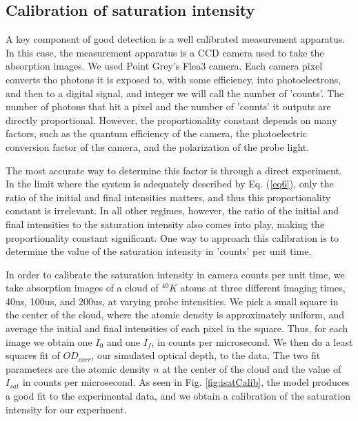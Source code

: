 \documentclass[12pt]{iopart}
\begin{document}
\subsection{Calibration of saturation intensity}
A key component of good detection is a well calibrated measurement apparatus. In this case, the measurement apparatus is a CCD camera used to take the absorption images. We used Point Grey's Flea3 camera.  Each camera pixel  converts tho photons it is exposed to, with some efficiency, into photoelectrons, and then to a digital signal, and integer we will call the number of 'counts'. The number of photons that hit a pixel and the number of 'counts' it outputs are directly proportional. However, the proportionality constant depends on many factors, such as the quantum efficiency of the camera, the photoelectric conversion factor of the camera, and the polarization of the probe light. 
\par The most accurate way to determine this factor is through a direct experiment. In the limit where the system is adequately described by Eq. (\ref{eq6}), only the ratio of the initial and final intensities matters, and thus this proportionality constant is irrelevant. In all other regimes, however, the ratio of the initial and final intensities to the saturation intensity also comes into play, making the proportionality constant significant. One way to approach this calibration is to determine the value of the saturation intensity in 'counts' per unit time. 
\par In order to calibrate the saturation intensity in camera counts per unit time, we take absorption images of a cloud of $^{40}K$ atoms at three different imaging times, 40us, 100us, and 200us, at varying probe intensities. We pick a small square in the center of the cloud, where the atomic density is approximately uniform, and average the initial and final intensities of each pixel in the square. Thus, for each image we obtain one $I_0$ and one $I_f$, in counts per microsecond. We then do a least squares fit of $OD_{corr}$, our simulated optical depth, to the data. The two fit parameters are the atomic density $n$ at the center of the cloud and the value of $I_{sat}$ in counts per microsecond. As seen in Fig. \ref{fig:isatCalib}, the model produces a good fit to the experimental data, and we obtain a calibration of the saturation intensity for our experiment. 
\end{document}
